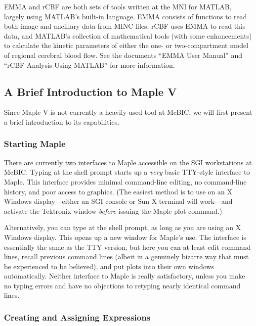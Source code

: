 EMMA and rCBF are both sets of tools written at the MNI for MATLAB,
largely using MATLAB's built-in language.  EMMA consists of functions
to read both image and ancillary data from MINC files; rCBF uses EMMA
to read this data, and MATLAB's collection of mathematical tools (with
some enhancements) to calculate the kinetic parameters of either
the one- or two-compartment model of regional cerebral blood flow.
See the documents ``EMMA User Manual'' and ``rCBF Analysis Using
MATLAB'' for more information.

\subsection{A Brief Introduction to Maple V}

Since Maple V is not currently a heavily-used tool at McBIC, we will
first present a brief introduction to its capabilities.

\subsubsection{Starting Maple}

There are currently two interfaces to Maple accessible on the SGI
workstations at McBIC.  Typing  at the shell prompt starts
up a {\em very} basic TTY-style interface to Maple.  This interface
provides minimal command-line editing, no command-line history, and
poor access to graphics.  (The easiest method is to use
 on an X Windows display---either an SGI console or Sun
X terminal will work---and activate the Tektronix window {\em before}
issuing the Maple plot command.)

Alternatively, you can type  at the shell prompt, as long
as you are using an X Windows display.  This opens up a new window for
Maple's use.  The interface is essentially the same as the TTY version,
but here you can at least edit command lines, recall previous command
lines (albeit in a genuinely bizarre way that must be experienced to be
believed), and put plots into their own windows automatically.  Neither
interface to Maple is really satisfactory, unless you make no typing
errors and have no objections to retyping nearly identical command
lines.

\subsubsection{Creating and Assigning Expressions}

